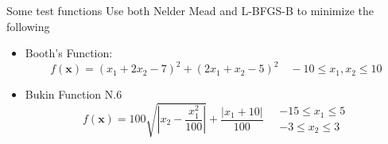 \documentclass[10pt]{beamer}
\begin{document}
                                                                                              \begin{frame}{Some test functions}
                                                                                                Use both Nelder Mead and L-BFGS-B to minimize the following
                                                                                                \begin{itemize}
                                                                                                \item Booth's Function:
                                                                                                  \begin{equation*}
                                                                                                    f({\bm x})=(x_1+2x_2-7)^2+(2x_1+x_2-5)^2
                                                                                                    \quad-10\leq x_1,x_2\leq 10
                                                                                                  \end{equation*}
                                                                                                \item Bukin Function N.6
                                                                                                  \begin{equation*}
                                                                                                    f({\bm x})=100\sqrt{\left|x_2-\frac{x_1^2}{100}\right|}+\frac{|x_1+10|}{100}
                                                                                                    \quad\begin{array}{c}
                                                                                                           -15\leq x_1\leq 5\\
                                                                                                           -3\leq x_2\leq 3
                                                                                                         \end{array}
                                                                                                       \end{equation*}
                                                                                                     \end{itemize}
                                                                                                   \end{frame}
\end{document}
